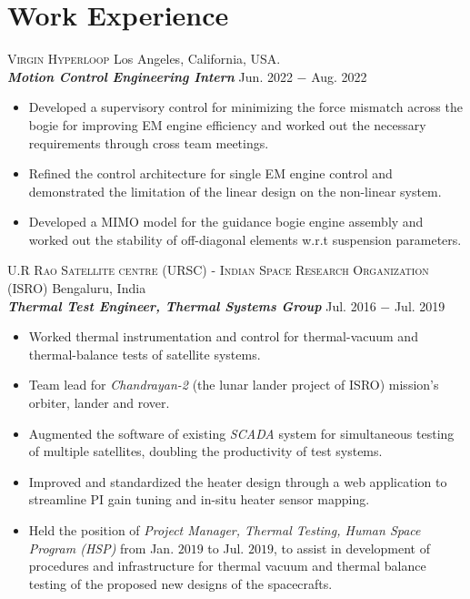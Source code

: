 \documentclass[letterpaper,10pt]{article}
\begin{document}
\section{Work Experience}
\noindent \textsc{Virgin Hyperloop} \hfill Los Angeles, California, USA.\\
\vspace{3pt}
\textbf{\textit{Motion Control Engineering Intern}} \hfill Jun. 2022 $-$ Aug. 2022
\begin{itemize}[noitemsep,nolistsep,leftmargin=0.25in,label={--}]
    \item Developed a supervisory control for minimizing the force mismatch
across the bogie for improving EM engine efficiency and worked out the necessary
requirements through cross team meetings.
\item Refined the control architecture for single EM engine control and
demonstrated the limitation of the linear design on the non-linear system.
\item Developed a MIMO model for the guidance bogie engine assembly and worked
out the stability of off-diagonal elements w.r.t suspension parameters.
\end{itemize}
\vspace{10pt}
\noindent \textsc{U.R Rao Satellite centre (URSC) - Indian Space Research
Organization (ISRO)} \hfill Bengaluru, India \\
\vspace{3pt}
\textbf{\textit{Thermal Test Engineer, Thermal Systems Group}} \hfill Jul. 2016 $-$ Jul. 2019
\begin{itemize}[noitemsep,nolistsep,leftmargin=0.25in,label={--}]
    \item Worked thermal instrumentation and control for thermal-vacuum and thermal-balance tests of satellite systems.
	\item Team lead for \textit{Chandrayan-2} (the lunar lander project of ISRO) mission's orbiter, lander and rover.
    \item Augmented the software of existing \textit{SCADA} system for simultaneous testing of multiple satellites, doubling the productivity of test systems.
	\item Improved and standardized the heater design through a web application to streamline PI gain tuning and in-situ heater sensor mapping.
    \item Held the position of \textit{Project Manager, Thermal Testing, Human Space Program (HSP)} from Jan. $2019$ to Jul. $2019$, to assist in development of procedures and infrastructure for thermal vacuum and thermal balance testing of the proposed new designs of the spacecrafts.\\
\end{itemize}
\end{document}
